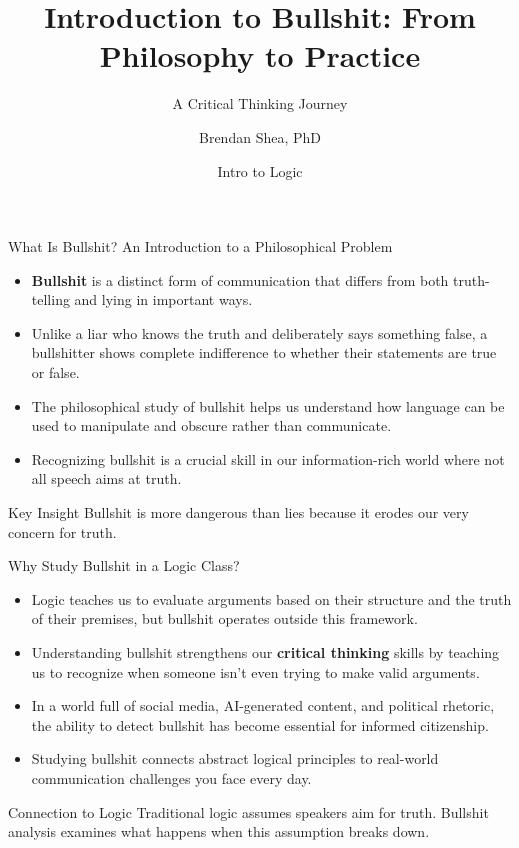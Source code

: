 \documentclass{beamer}
\title{Introduction to Bullshit: From Philosophy to Practice}
\subtitle{A Critical Thinking Journey}
\author{Brendan Shea, PhD}
\date{Intro to Logic}
\begin{document}
	
	\frame{\titlepage}
	
	\begin{frame}{What Is Bullshit? An Introduction to a Philosophical Problem}
		\begin{itemize}
			\item \textbf{Bullshit} is a distinct form of communication that differs from both truth-telling and lying in important ways.
			\item Unlike a liar who knows the truth and deliberately says something false, a bullshitter shows complete indifference to whether their statements are true or false.
			\item The philosophical study of bullshit helps us understand how language can be used to manipulate and obscure rather than communicate.
			\item Recognizing bullshit is a crucial skill in our information-rich world where not all speech aims at truth.
		\end{itemize}
		
		\begin{alertblock}{Key Insight}
			Bullshit is more dangerous than lies because it erodes our very concern for truth.
		\end{alertblock}
	\end{frame}
	
	\begin{frame}{Why Study Bullshit in a Logic Class?}
		\begin{itemize}
			\item Logic teaches us to evaluate arguments based on their structure and the truth of their premises, but bullshit operates outside this framework.
			\item Understanding bullshit strengthens our \textbf{critical thinking} skills by teaching us to recognize when someone isn't even trying to make valid arguments.
			\item In a world full of social media, AI-generated content, and political rhetoric, the ability to detect bullshit has become essential for informed citizenship.
			\item Studying bullshit connects abstract logical principles to real-world communication challenges you face every day.
		\end{itemize}
		
		\begin{block}{Connection to Logic}
			Traditional logic assumes speakers aim for truth. Bullshit analysis examines what happens when this assumption breaks down.
		\end{block}
	\end{frame}
	
\end{document}
